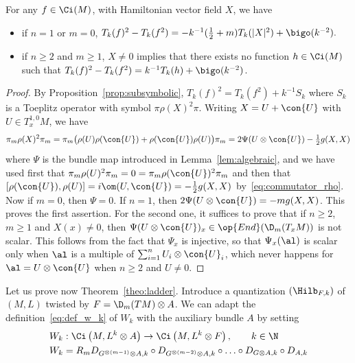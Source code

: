 \begin{prop}\label{prop:fonction}
For any $f \in \Ci (M)$, with Hamiltonian vector field $X$, we have
\begin{itemize}
\item if $n =1$ or $m=0$, $ T_k (f)^2 - T_k (f^2) = -k^{-1} (\frac{1}{2} + m)T_k (|X|^2) + \bigo (k^{-2}).$
\item if $n \geqslant 2$ and $m \geqslant 1$, $ X \neq 0$ implies that there exists no function $h \in \Ci (M)$ such that $T_k (f)^2 - T_k (f^2) = k^{-1} T_k (h) + \bigo (k^{-2})$.
\end{itemize}
\end{prop}

\begin{proof}
By Proposition~\ref{prop:subsymbolic}, $ T_k (f)^2 = T_k (f^2) + k^{-1} S_k $ where $S_k$ is a Toeplitz operator with symbol $\pi \rho(X)^2 \pi$. Writing $X = U + \con {U}$ with $U \in T^{1,0}_xM$, we have
\[
\pi_m \rho (X)^2 \pi_m = \pi_m \bigl(\rho (U) \rho (\con{U}) + \rho
(\con {U}) \rho (U) \bigr) \pi_m = 2 \Psi (U \otimes \con{U}) - \tfrac{1}{2} g
(X,X)
\]
where $\Psi$ is the bundle map introduced in Lemma~\ref{lem:algebraic}, and we have used first that $\pi_m \rho (U) ^2 \pi_m =0 =\pi_m
\rho(\con{U})^2 \pi_m $ and then that $[\rho(\con{U}), \rho (U)] = i \om (U, \con {U}) = -\frac{1}{2} g (X,X)$ by~\eqref{eq:commutator_rho}. Now if $m=0$, then $\Psi =0$. If $n=1$, then $2 \Psi (U \otimes \con{U}) = - m g (X,X)$. This proves the first assertion. For the second one, it suffices to prove that if $n \geqslant 2$, $m \geqslant 1$ and $X(x) \neq 0$, then $\Psi (U \otimes \con{U})_x \in \op{End}(\D_m (T_xM))$ is not scalar. This follows from the fact that $\Psi_x$ is injective, so that $\Psi_x (\al) $ is scalar only when $ \al$ is a multiple of $\sum_{i=1}^{n} U_i \otimes
\con{U}_i$, which never happens for $\al = U \otimes \con{U}$ when $n
\geqslant 2$ and $U \neq 0$.
\end{proof}


Let us prove now Theorem~\ref{theo:ladder}. Introduce a quantization $(\Hilb_{F,k})$ of $(M,L)$ twisted by $F = \D_m (TM) \otimes A$. We can adapt the definition~\eqref{eq:def_w_k} of $W_k$ with the auxiliary bundle $A$ by setting
\begin{equation}\label{eq:def_w_k_A}
\begin{split}
&W_k : \Ci \left(M, L^k \otimes A\right) \rightarrow \Ci \left(M, L^k \otimes F\right), \qquad k \in \N\\
&W_k = R_m D_{G^{\otimes (m-1)} \otimes A,k} \circ D_{G^{\otimes (m-2)}\otimes A,k} \circ \ldots \circ D_{G \otimes A, k} \circ D_{A,k}
\end{split}
\end{equation}

